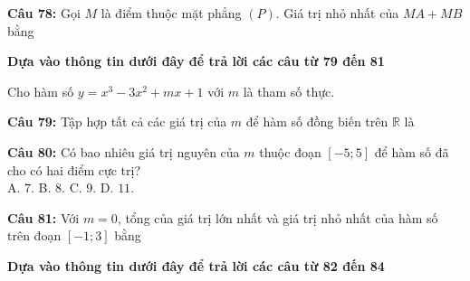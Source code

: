 \documentclass[12pt,a4paper]{article}
\begin{document}


\vspace{0.3cm}

\noindent \textbf{Câu 78:} Gọi $M$ là điểm thuộc mặt phẳng $(P)$. Giá trị nhỏ nhất của $MA+MB$ bằng\\
\noindent{}



\vspace{0.5cm}
\noindent\textbf{Dựa vào thông tin dưới đây để trả lời các câu từ 79 đến 81}%


\par\nobreak

Cho hàm số $y=x^3-3x^2+mx+1$ với $m$ là tham số thực.

\par\nobreak


\noindent \textbf{Câu 79:} Tập hợp tất cả các giá trị của $m$ để hàm số đồng biến trên $\mathbb{R}$ là\\
\noindent{}



\vspace{0.3cm}

\noindent \textbf{Câu 80:} Có bao nhiêu giá trị nguyên của $m$ thuộc đoạn $[-5;5]$ để hàm số đã cho có hai điểm cực trị?\\
\noindent A. $7$. \hfill B. $8$. \hfill C. $9$. \hfill D. $11$.



\vspace{0.3cm}

\noindent \textbf{Câu 81:} Với $m=0$, tổng của giá trị lớn nhất và giá trị nhỏ nhất của hàm số trên đoạn $[-1;3]$ bằng\\
\noindent{}



\vspace{0.5cm}
\noindent\textbf{Dựa vào thông tin dưới đây để trả lời các câu từ 82 đến 84}%
\end{document}
